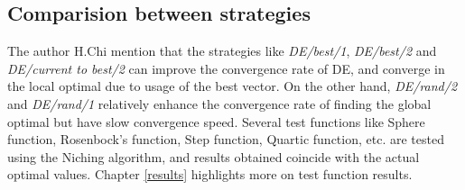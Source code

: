 \subsection{Comparision between strategies}
The author H.Chi \cite{chi} mention that the strategies like \textit{DE/best/1}, \textit{DE/best/2} and \textit{DE/current to best/2} can improve the convergence rate of DE, and converge in the local optimal due to usage of the best vector. On the other hand, \textit{DE/rand/2} and \textit{DE/rand/1} relatively enhance the convergence rate of finding the global optimal but have slow convergence speed. Several test functions like Sphere function, Rosenbock's function, Step function, Quartic function, etc. are tested using the Niching algorithm, and results obtained coincide with the actual optimal values. Chapter \ref{results} highlights more on test function results.